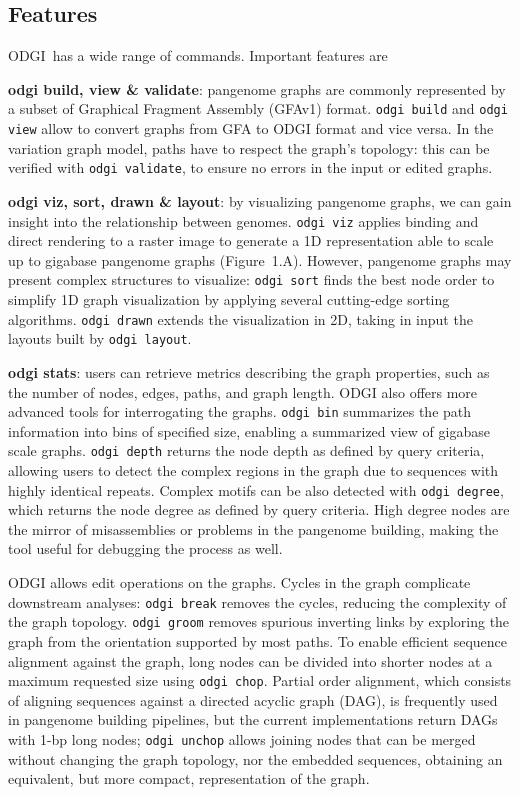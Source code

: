 \documentclass{bioinfo}
\newcommand{\odgi}{ODGI}
\newcommand{\cmd}[1]{{\texttt{#1}}}
\newcommand{\cmdbf}[1]{{\textbf{#1}}}
\newcommand{\topic}[1]{{\cmdbf{#1}}:}
\begin{document}
    \subsection{Features}

    \odgi\ has a wide range of commands. Important features are

    \topic{odgi build, view \& validate} pangenome graphs are commonly
    represented by a subset of Graphical Fragment Assembly (GFAv1)
    format\citep{GFAv1}.  \cmd{odgi build} and \cmd{odgi view} allow
    to convert graphs from GFA to ODGI format and vice versa.  In the
    variation graph model, paths have to respect the graph's topology:
    this can be verified with \texttt{odgi validate}, to ensure no
    errors in the input or edited graphs.

    \topic{odgi viz, sort, drawn \& layout} by visualizing pangenome
    graphs, we can gain insight into the relationship between
    genomes. \cmd{odgi viz} applies binding and direct rendering to
    a raster image to generate a 1D representation able to scale up to
    gigabase pangenome graphs
    (Figure~1.A\vphantom{\ref{fig:01}}). However, pangenome graphs may
    present complex structures to visualize: \cmd{odgi sort} finds
    the best node order to simplify 1D graph visualization by applying
    several cutting-edge sorting algorithms. \cmd{odgi drawn}
    extends the visualization in 2D, taking in input the layouts built
    by \cmd{odgi layout}.

    \topic{odgi stats} users can retrieve metrics describing the graph properties, such as the number of
    nodes, edges, paths, and graph length. ODGI also offers more advanced tools for interrogating the graphs.
    \texttt{odgi bin} summarizes the path information into bins of specified size, enabling a summarized view of
    gigabase scale graphs. \texttt{odgi depth} returns the node depth as defined by query criteria, allowing users to
    detect the complex regions in the graph due to sequences with highly identical repeats. Complex motifs can be also
    detected with \texttt{odgi degree}, which returns the node degree as defined by query criteria. High degree nodes
    are the mirror of misassemblies or problems in the pangenome building, making the tool useful for debugging the
    process as well.


    ODGI allows edit operations on the graphs. Cycles in the graph complicate downstream analyses: \texttt{odgi break}
    removes the cycles, reducing the complexity of the graph topology. \texttt{odgi groom} removes spurious inverting
    links by exploring the graph from the orientation supported by most paths. To enable efficient sequence alignment
    against the graph, long nodes can be divided into shorter nodes at a maximum requested size using
    \texttt{odgi chop}. Partial order alignment, which consists of aligning sequences against a directed acyclic graph
    (DAG), is frequently used in pangenome building pipelines, but the current implementations return DAGs with 1-bp
    long nodes; \texttt{odgi unchop} allows joining nodes that can be merged without changing the graph topology, nor
    the embedded sequences, obtaining an equivalent, but more compact, representation of the graph.
\end{document}
